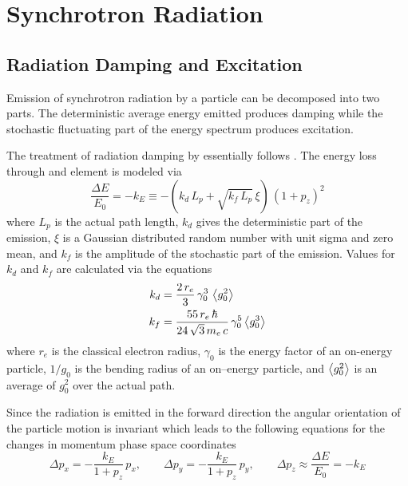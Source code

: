 \chapter{Synchrotron Radiation}

\section{Radiation Damping and Excitation}
\label{s:radiation}

Emission of synchrotron radiation by a particle can be decomposed into two parts. The deterministic
average energy emitted produces damping while the stochastic fluctuating part of the energy spectrum
produces excitation\cite{b:jowett}.

The treatment of radiation damping by \bmad essentially follows \mad. The energy loss through and element is
modeled via 
\begin{equation}
  \frac{\Delta E}{E_0} = -k_E \equiv -(k_d \, L_p + \sqrt{k_f \, L_p} \, \xi) \, (1 + p_z)^2
\end{equation}
where $L_p$ is the actual path length, $k_d$ gives the deterministic part of the emission, $\xi$ is
a Gaussian distributed random number with unit sigma and zero mean, and $k_f$ is the amplitude of
the stochastic part of the emission. Values for $k_d$ and $k_f$ are calculated via the equations
\begin{align}
  k_d &= \frac{2 \, r_e}{3} \, \gamma_0^3 \, \left\langle g_0^2 \right\rangle
    \label{k2r3g} \\
  k_f &= \frac{55 \, r_e \, \hbar}{24 \, \sqrt{3} \, m_e \, c} \, 
    \gamma_0^5 \left\langle g_0^3 \right\rangle
    \label{k55rh}
\end{align}
where $r_e$ is the classical electron radius, $\gamma_0$ is the energy factor of an on-energy
particle, $1/g_0$ is the bending radius of an on--energy particle, and $\left\langle g_0^2 \right\rangle$ is an average
of $g_0^2$ over the actual path.

Since the radiation is emitted in the forward direction the angular orientation of the particle
motion is invariant which leads to the following equations for the changes in momentum phase space
coordinates
\begin{equation}
  \Delta p_x = -\frac{k_E}{1 + p_z} \, p_x , \qquad
  \Delta p_y = -\frac{k_E}{1 + p_z} \, p_y, \qquad
  \Delta p_z \approx \frac{\Delta E}{E_0} = -k_E 
  \label{pk1pp}
\end{equation}

